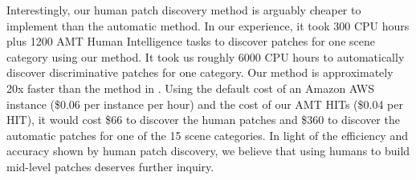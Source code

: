 \documentclass[10pt,twocolumn,letterpaper]{article}
\begin{document}


Interestingly, our human patch discovery method is arguably cheaper to implement than the automatic method. In our experience, it took 300 CPU hours plus 1200 AMT Human Intelligence tasks to discover patches for one scene category using our method. It took us roughly 6000 CPU hours to automatically discover discriminative patches for one category. Our method is approximately 20x faster than the method in \cite{singh2012unsupervised}. Using the default cost of an Amazon AWS instance (\$0.06 per instance per hour) and the cost of our AMT HITs (\$0.04 per HIT), it would cost \$66 to discover the human patches and \$360 to discover the automatic patches for one of the 15 scene categories. In light of the efficiency and accuracy shown by human patch discovery, we believe that using humans to build mid-level patches deserves further inquiry.


{\footnotesize


}
\end{document}
